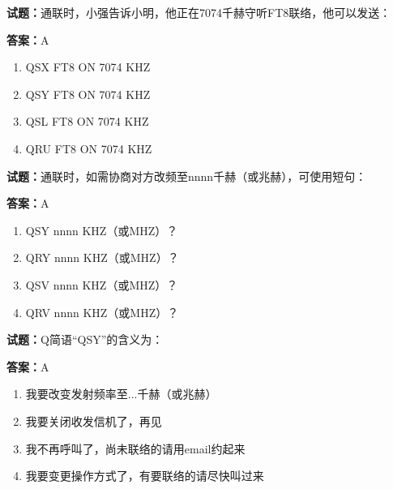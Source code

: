 \documentclass{ctexbook}
\begin{document}




\vspace{1em}

\textbf{试题：}通联时，小强告诉小明，他正在7074千赫守听FT8联络，他可以发送： 

\textbf{答案：}A 

\begin{enumerate}[leftmargin=3em]
  \item QSX FT8 ON 7074 KHZ 

  \item QSY FT8 ON 7074 KHZ 

  \item QSL FT8 ON 7074 KHZ 

  \item QRU FT8 ON 7074 KHZ 

\end{enumerate}






\vspace{1em}

\textbf{试题：}通联时，如需协商对方改频至nnnn千赫（或兆赫），可使用短句： 

\textbf{答案：}A 

\begin{enumerate}[leftmargin=3em]
  \item QSY nnnn KHZ（或MHZ）？ 

  \item QRY nnnn KHZ（或MHZ）？ 

  \item QSV nnnn KHZ（或MHZ）？ 

  \item QRV nnnn KHZ（或MHZ）？ 

\end{enumerate}





\vspace{1em}

\textbf{试题：}Q简语“QSY”的含义为： 

\textbf{答案：}A 

\begin{enumerate}[leftmargin=3em]
  \item 我要改变发射频率至...千赫（或兆赫） 

  \item 我要关闭收发信机了，再见 

  \item 我不再呼叫了，尚未联络的请用email约起来 

  \item 我要变更操作方式了，有要联络的请尽快叫过来 

\end{enumerate}
\end{document}
